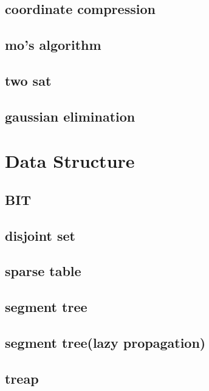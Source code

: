 \subsection{coordinate compression}

\subsection{mo's algorithm}

\subsection{two sat}

\subsection{gaussian elimination}


\section{Data Structure}
\subsection{BIT}

\subsection{disjoint set}

\subsection{sparse table}

\subsection{segment tree}

\subsection{segment tree(lazy propagation)}

\subsection{treap}


